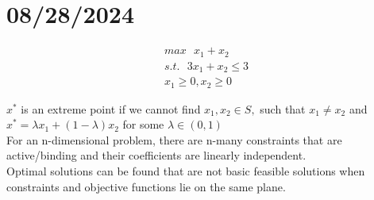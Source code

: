 \section{08/28/2024}

\begin{gather}
max \text{ } {x_1 + x_2} \\
s.t. \text{ } 3x_1 + x_2 \leq 3 \\
x_1 \geq 0, x_2 \geq 0
\end{gather}

$x^*$ is an extreme point if we cannot find $x_1, x_2 \in S, $ such that $x_1 \neq x_2 $ and
$x^* = \lambda x_1 + (1-\lambda)x_2$ for some $\lambda \in (0,1)$
\\
For an n-dimensional problem, there are n-many constraints that are active/binding and their coefficients are linearly independent. 
\\
Optimal solutions can be found that are not basic feasible solutions when constraints and objective functions lie on the same plane.
\\
